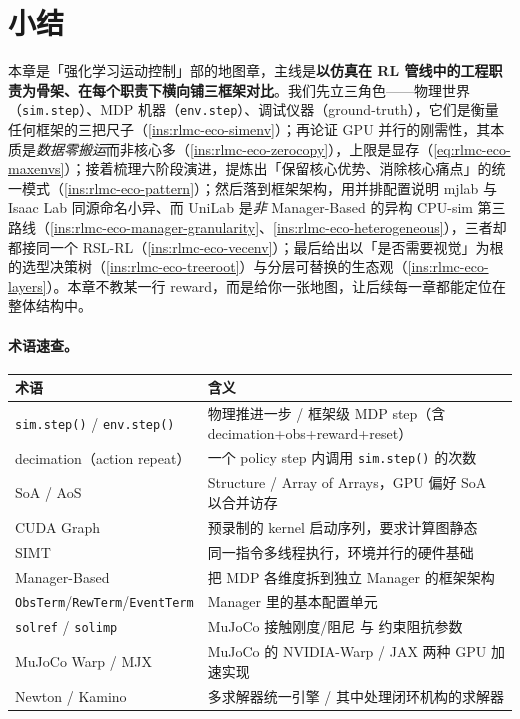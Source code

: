 \section*{小结}
\label{sec:rlmc-eco-summary}

本章是「强化学习运动控制」部的地图章，主线是\textbf{以仿真在 RL 管线中的工程职责为骨架、在每个职责下横向铺三框架对比}。我们先立三角色——物理世界（\verb|sim.step|）、MDP 机器（\verb|env.step|）、调试仪器（ground-truth），它们是衡量任何框架的三把尺子（\cref{ins:rlmc-eco-simenv}）；再论证 GPU 并行的刚需性，其本质是\emph{数据零搬运}而非核心多（\cref{ins:rlmc-eco-zerocopy}），上限是显存（\cref{eq:rlmc-eco-maxenvs}）；接着梳理六阶段演进，提炼出「保留核心优势、消除核心痛点」的统一模式（\cref{ins:rlmc-eco-pattern}）；然后落到框架架构，用并排配置说明 mjlab 与 Isaac Lab 同源命名小异、而 UniLab 是\emph{非} Manager-Based 的异构 CPU-sim 第三路线（\cref{ins:rlmc-eco-manager-granularity}、\cref{ins:rlmc-eco-heterogeneous}），三者却都接同一个 RSL-RL（\cref{ins:rlmc-eco-vecenv}）；最后给出以「是否需要视觉」为根的选型决策树（\cref{ins:rlmc-eco-treeroot}）与分层可替换的生态观（\cref{ins:rlmc-eco-layers}）。本章不教某一行 reward，而是给你一张地图，让后续每一章都能定位在整体结构中。

\paragraph{术语速查。}
\begin{center}
\small
\begin{tabular}{@{}ll@{}}
\toprule
术语 & 含义 \\
\midrule
\verb|sim.step()| / \verb|env.step()| & 物理推进一步 / 框架级 MDP step（含 decimation+obs+reward+reset） \\
decimation（action repeat） & 一个 policy step 内调用 \verb|sim.step()| 的次数 \\
SoA / AoS & Structure / Array of Arrays，GPU 偏好 SoA 以合并访存 \\
CUDA Graph & 预录制的 kernel 启动序列，要求计算图静态 \\
SIMT & 同一指令多线程执行，环境并行的硬件基础 \\
Manager-Based & 把 MDP 各维度拆到独立 Manager 的框架架构 \\
\verb|ObsTerm|/\allowbreak\verb|RewTerm|/\allowbreak\verb|EventTerm| & Manager 里的基本配置单元 \\
\verb|solref| / \verb|solimp| & MuJoCo 接触刚度/阻尼 与 约束阻抗参数 \\
MuJoCo Warp / MJX & MuJoCo 的 NVIDIA-Warp / JAX 两种 GPU 加速实现 \\
Newton / Kamino & 多求解器统一引擎 / 其中处理闭环机构的求解器 \\
\bottomrule
\end{tabular}
\end{center}

